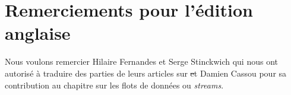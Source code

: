 \documentclass[a4paper,10pt,twoside]{book}
\begin{document}







\section*{Remerciements pour l'\'edition anglaise}


Nous voulons remercier Hilaire Fernandes et Serge Stinckwich qui nous
ont autoris\'e \`a traduire des parties de leurs articles sur \st et
Damien Cassou pour sa contribution au chapitre sur les flots de
donn\'ees ou \emph{streams}.
\end{document}

